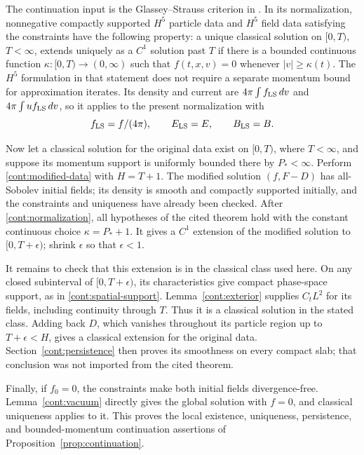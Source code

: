 The continuation input is the Glassey--Strauss criterion in
\cite[Theorem~1.1 and Footnote~1, arXiv version]{LukStrain2014Continuation}.
In its normalization, nonnegative compactly supported $H^5$ particle
data and $H^5$ field data satisfying the constraints have the following
property: a unique classical solution on $[0,T)$, $T<\infty$, extends
uniquely as a $C^1$ solution past $T$ if there is a bounded continuous
function $\kappa:[0,T)\to(0,\infty)$ such that $f(t,x,v)=0$ whenever
$|v|\ge\kappa(t)$.
The $H^5$ formulation in that statement does not require a separate
momentum bound for approximation iterates.
Its density and current are $4\pi\int f_{\rm LS}\,dv$ and
$4\pi\int u f_{\rm LS}\,dv$, so it applies to the present normalization
with
\begin{equation}\label{cont:normalization}
 f_{\rm LS}=f/(4\pi),\qquad E_{\rm LS}=E,
 \qquad B_{\rm LS}=B.
\end{equation}

Now let a classical solution for the original data exist on $[0,T)$,
where $T<\infty$, and suppose its momentum support is uniformly
bounded there by $P_*<\infty$.
Perform \eqref{cont:modified-data} with $H=T+1$.
The modified solution $(f,F-D)$ has all-Sobolev initial fields;
its density is smooth and compactly supported initially, and the
constraints and uniqueness have already been checked.
After \eqref{cont:normalization}, all hypotheses of the cited theorem
hold with the constant continuous choice $\kappa=P_*+1$.
It gives a $C^1$ extension of the modified solution to $[0,T+\epsilon)$;
shrink $\epsilon$ so that $\epsilon<1$.

It remains to check that this extension is in the classical class used
here.  On any closed subinterval of $[0,T+\epsilon)$, its
characteristics give compact phase-space support, as in
\eqref{cont:spatial-support}.  Lemma~\ref{cont:exterior} supplies
$C_tL^2$ for its fields, including continuity through $T$.
Thus it is a classical solution in the stated class.
Adding back $D$, which vanishes throughout its particle region up to
$T+\epsilon<H$, gives a classical extension for the original data.
Section~\ref{cont:persistence} then proves its smoothness on every
compact slab; that conclusion was not imported from the cited theorem.

Finally, if $f_0=0$, the constraints make both initial fields
divergence-free.  Lemma~\ref{cont:vacuum} directly gives the global
solution with $f=0$, and classical uniqueness applies to it.
This proves the local existence, uniqueness, persistence, and
bounded-momentum continuation assertions of
Proposition~\ref{prop:continuation}.
